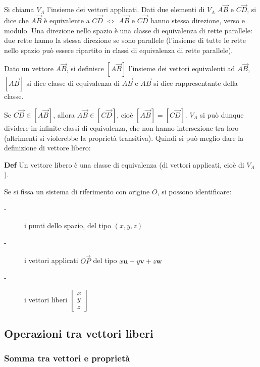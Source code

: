 \documentclass{article}
\begin{document}
Si chiama $V_{A}$ l'insieme dei vettori applicati. Dati due elementi di $%
V_{A}$ $A\vec{B}$ e $C\vec{D}$, si dice che $A\vec{B}$ \`{e} equivalente a $C%
\vec{D}$ $\Longleftrightarrow $ $A\vec{B}$ e $C\vec{D}$ hanno stessa
direzione, verso e modulo. Una direzione nello spazio \`{e} una classe di
equivalenza di rette parallele: due rette hanno la stessa direzione se sono
parallele (l'insieme di tutte le rette nello spazio pu\`{o} essere ripartito
in classi di equivalenza di rette parallele).

Dato un vettore $A\vec{B}$, si definisce $\left[ A\vec{B}\right] $ l'insieme
dei vettori equivalenti ad $A\vec{B}$, $\left[ A\vec{B}\right] $ si dice
classe di equivalenza di $A\vec{B}$ e $A\vec{B}$ si dice rappresentante
della classe.

Se $C\vec{D}\in \left[ A\vec{B}\right] $, allora $A\vec{B}\in \left[ C\vec{D}%
\right] $, cio\`{e} $\left[ A\vec{B}\right] =\left[ C\vec{D}\right] $. $%
V_{A} $ si pu\`{o} dunque dividere in infinite classi di equivalenza, che
non hanno intersezione tra loro (altrimenti si violerebbe la propriet\`{a}
transitiva). Quindi si pu\`{o} meglio dare la definizione di vettore libero:

\textbf{Def} Un vettore libero \`{e} una classe di equivalenza (di vettori
applicati, cio\`{e} di $V_{A}$).

Se si fissa un sistema di riferimento con origine $O$, si possono
identificare:

\begin{description}
\item[-] i punti dello spazio, del tipo $\left( x,y,z\right) $

\item[-] i vettori applicati $O\vec{P}$ del tipo $x\mathbf{u}+y\mathbf{v}+z%
\mathbf{w}$

\item[-] i vettori liberi $\left[ 
\begin{array}{c}
x \\ 
y \\ 
z%
\end{array}%
\right] $
\end{description}

\subsection{Operazioni tra vettori liberi}

\subsubsection{Somma tra vettori e propriet\`{a}}
\end{document}
